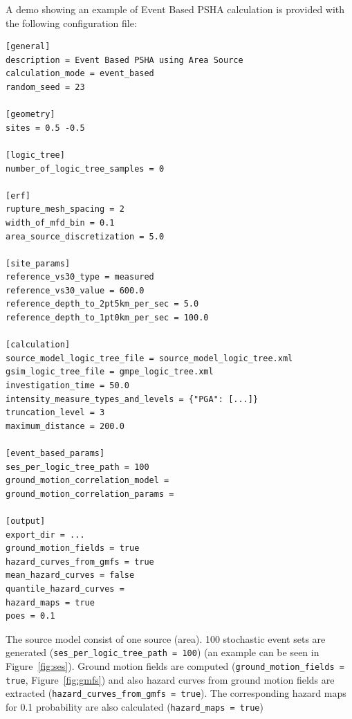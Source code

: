A demo showing an example of Event Based PSHA calculation is provided with the
following configuration file:

\begin{Verbatim}[frame=single, commandchars=\\\{\}, fontsize=\normalsize]
[general]
description = Event Based PSHA using Area Source
calculation_mode = event_based
random_seed = 23

[geometry]
sites = 0.5 -0.5

[logic_tree]
number_of_logic_tree_samples = 0

[erf]
rupture_mesh_spacing = 2
width_of_mfd_bin = 0.1
area_source_discretization = 5.0

[site_params]
reference_vs30_type = measured
reference_vs30_value = 600.0
reference_depth_to_2pt5km_per_sec = 5.0
reference_depth_to_1pt0km_per_sec = 100.0

[calculation]
source_model_logic_tree_file = source_model_logic_tree.xml
gsim_logic_tree_file = gmpe_logic_tree.xml
investigation_time = 50.0
intensity_measure_types_and_levels = {"PGA": [...]}
truncation_level = 3
maximum_distance = 200.0

[event_based_params]
ses_per_logic_tree_path = 100
ground_motion_correlation_model =
ground_motion_correlation_params =

[output]
export_dir = ...
ground_motion_fields = true
hazard_curves_from_gmfs = true
mean_hazard_curves = false
quantile_hazard_curves =
hazard_maps = true
poes = 0.1
\end{Verbatim}

The source model consist of one source (area). 100 stochastic event sets  are
generated (\texttt{ses\_\-per\_\-logic\_\-tree\_\-path = 100}) (an example
can be seen in Figure~\ref{fig:ses}). Ground motion fields are computed
(\texttt{ground\_\-motion\_\-fields = true}, Figure~\ref{fig:gmfs}) and also
hazard curves from ground motion fields are extracted
(\texttt{hazard\_\-curves\_\-from\_\-gmfs = true}). The corresponding hazard
maps for 0.1 probability are also calculated (\texttt{hazard\_\-maps = true})

